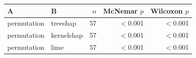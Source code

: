 \begin{tabular}{@{}llrrr@{}}
\toprule
A & B & $n$ & McNemar $p$ & Wilcoxon $p$ \\
\midrule
permutation & treeshap & 57 & $<$0.001 & $<$0.001 \\
permutation & kernelshap & 57 & $<$0.001 & $<$0.001 \\
permutation & lime & 57 & $<$0.001 & $<$0.001 \\
\bottomrule
\end{tabular}
